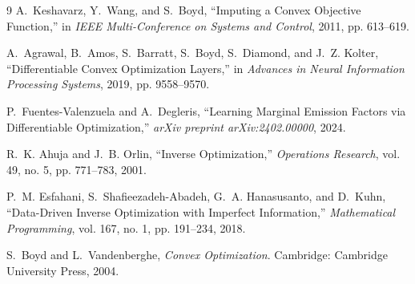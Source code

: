 \documentclass[conference]{IEEEtran}
\begin{document}

\begin{thebibliography}{9}
A.~Keshavarz, Y.~Wang, and S.~Boyd, ``Imputing a Convex Objective
Function,'' in \emph{IEEE Multi-Conference on Systems and Control},
2011, pp. 613--619.

A.~Agrawal, B.~Amos, S.~Barratt, S.~Boyd, S.~Diamond, and J.~Z. Kolter,
``Differentiable Convex Optimization Layers,'' in \emph{Advances in
Neural Information Processing Systems}, 2019, pp. 9558--9570.

P.~Fuentes-Valenzuela and A.~Degleris, ``Learning Marginal Emission
Factors via Differentiable Optimization,'' \emph{arXiv preprint
arXiv:2402.00000}, 2024.

R.~K. Ahuja and J.~B. Orlin, ``Inverse Optimization,''
\emph{Operations Research}, vol. 49, no. 5, pp. 771--783, 2001.

P.~M. Esfahani, S.~Shafieezadeh-Abadeh, G.~A. Hanasusanto, and
D.~Kuhn, ``Data-Driven Inverse Optimization with Imperfect
Information,'' \emph{Mathematical Programming}, vol. 167, no. 1,
pp. 191--234, 2018.

S.~Boyd and L.~Vandenberghe, \emph{Convex Optimization}.
Cambridge: Cambridge University Press, 2004.
\end{thebibliography}
\end{document}
